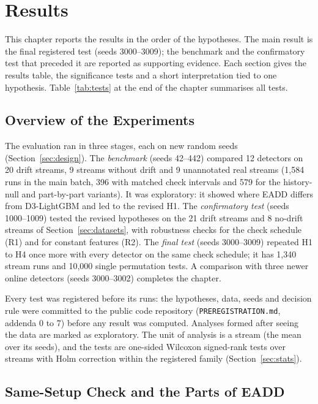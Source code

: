 \chapter{Results} \label{chap:results}

This chapter reports the results in the order of the hypotheses. The main result is the final registered test (seeds 3000--3009); the benchmark and the confirmatory test that preceded it are reported as supporting evidence. Each section gives the results table, the significance tests and a short interpretation tied to one hypothesis. Table~\ref{tab:tests} at the end of the chapter summarises all tests.

\section{Overview of the Experiments}
\label{sec:res-overview}

The evaluation ran in three stages, each on new random seeds (Section~\ref{sec:design}). The \emph{benchmark} (seeds 42--442) compared 12 detectors on 20 drift streams, 9 streams without drift and 9 unannotated real streams (1,584 runs in the main batch, 396 with matched check intervals and 579 for the history-null and part-by-part variants). It was exploratory: it showed where EADD differs from D3-LightGBM and led to the revised H1. The \emph{confirmatory test} (seeds 1000--1009) tested the revised hypotheses on the 21 drift streams and 8 no-drift streams of Section~\ref{sec:datasets}, with robustness checks for the check schedule (R1) and for constant features (R2). The \emph{final test} (seeds 3000--3009) repeated H1 to H4 once more with every detector on the same check schedule; it has 1,340 stream runs and 10,000 single permutation tests. A comparison with three newer online detectors (seeds 3000--3002) completes the chapter.

Every test was registered before its runs: the hypotheses, data, seeds and decision rule were committed to the public code repository (\texttt{PREREGISTRATION.md}, addenda 0 to 7) before any result was computed. Analyses formed after seeing the data are marked as exploratory. The unit of analysis is a stream (the mean over its seeds), and the tests are one-sided Wilcoxon signed-rank tests over streams with Holm correction within the registered family (Section~\ref{sec:stats}).

\section{Same-Setup Check and the Parts of EADD}
\label{sec:res-setup}

